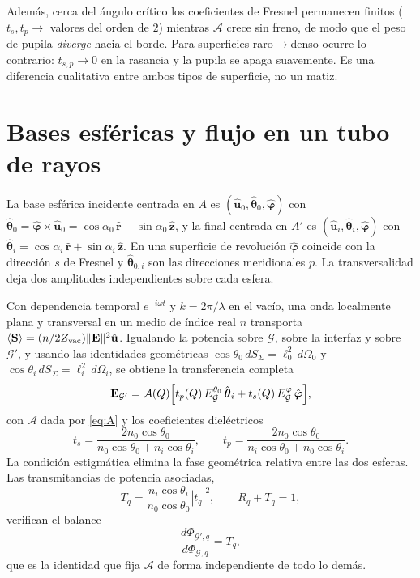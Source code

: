 \documentclass[11pt,a4paper]{article}
\newcommand{\ux}{\hat{\mathbf{u}}}
\newcommand{\rhat}{\hat{\mathbf{r}}}
\newcommand{\phihat}{\hat{\boldsymbol{\varphi}}}
\newcommand{\zhat}{\hat{\mathbf{z}}}
\newcommand{\thhat}{\hat{\boldsymbol{\theta}}}
\newcommand{\E}{\mathbf{E}}
\begin{document}
Además, cerca del ángulo crítico los coeficientes de Fresnel permanecen
finitos ($t_s,t_p\to$ valores del orden de $2$) mientras
$\mathcal{A}$ crece sin freno, de modo que el peso de pupila
\emph{diverge} hacia el borde. Para superficies raro$\to$denso ocurre lo
contrario: $t_{s,p}\to0$ en la rasancia y la pupila se apaga suavemente. Es
una diferencia cualitativa entre ambos tipos de superficie, no un matiz.

\section{Bases esféricas y flujo en un tubo de rayos}

La base esférica incidente centrada en $A$ es $(\ux_0,\thhat_0,\phihat)$ con
$\thhat_0=\phihat\times\ux_0=\cos\alpha_0\,\rhat-\sin\alpha_0\,\zhat$, y la
final centrada en $A'$ es $(\ux_i,\thhat_i,\phihat)$ con
$\thhat_i=\cos\alpha_i\,\rhat+\sin\alpha_i\,\zhat$. En una superficie de
revolución $\phihat$ coincide con la dirección $s$ de Fresnel y $\thhat_{0,i}$
son las direcciones meridionales $p$. La transversalidad deja dos amplitudes
independientes sobre cada esfera.

Con dependencia temporal $e^{-i\omega t}$ y $k=2\pi/\lambda$ en el vacío, una
onda localmente plana y transversal en un medio de índice real $n$ transporta
$\langle\mathbf{S}\rangle=(n/2Z_{\rm vac})\|\E\|^2\ux$. Igualando la potencia
sobre $\mathcal{G}$, sobre la interfaz y sobre $\mathcal{G}'$, y usando las
identidades geométricas $\cos\theta_0\,dS_\Sigma=\ell_0^2\,d\Omega_0$ y
$\cos\theta_i\,dS_\Sigma=\ell_i^2\,d\Omega_i$, se obtiene la transferencia
completa
\begin{equation}
  \E_{\mathcal{G}'}
  =\mathcal{A}(Q)\Bigl[t_p(Q)\,E_{\mathcal{G}}^{\theta_0}\,\thhat_i
  +t_s(Q)\,E_{\mathcal{G}}^{\varphi}\,\phihat\Bigr],
  \label{eq:transfer}
\end{equation}
con $\mathcal{A}$ dada por \eqref{eq:A} y los coeficientes dieléctricos
\begin{equation}
  t_s=\frac{2n_0\cos\theta_0}{n_0\cos\theta_0+n_i\cos\theta_i},\qquad
  t_p=\frac{2n_0\cos\theta_0}{n_i\cos\theta_0+n_0\cos\theta_i}.
  \label{eq:fresnel}
\end{equation}
La condición estigmática elimina la fase geométrica relativa entre las dos
esferas. Las transmitancias de potencia asociadas,
\begin{equation}
  T_q=\frac{n_i\cos\theta_i}{n_0\cos\theta_0}|t_q|^2,\qquad R_q+T_q=1,
  \label{eq:T}
\end{equation}
verifican el balance
\begin{equation}
  \frac{d\Phi_{\mathcal{G}',q}}{d\Phi_{\mathcal{G},q}}=T_q ,
  \label{eq:balance}
\end{equation}
que es la identidad que fija $\mathcal{A}$ de forma independiente de todo lo
demás.
\end{document}
